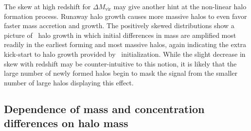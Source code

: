 The skew at high redshift for $\Delta M_{\mathrm{vir}}$ may give another hint at the non-linear halo formation process.  Runaway halo growth causes more massive halos to even favor faster mass accretion and growth.  The positively skewed distributions show a picture of \lpt\ halo growth in which initial differences in mass are amplified most readily in the earliest forming and most massive halos, again indicating the extra kick-start to halo growth provided by \lpt\ initialization.  While the slight decrease in skew with redshift may be counter-intuitive to this notion, it is likely that the large number of newly formed halos begin to mask the signal from the smaller number of large halos displaying this effect.




\subsection{Dependence of mass and concentration differences on halo mass}


